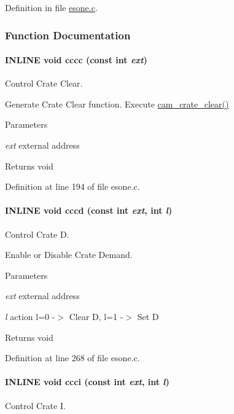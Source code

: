 Definition in file \hyperlink{esone_8c_source}{esone.c}.

\subsubsection{Function Documentation}
\paragraph[{cccc}]{\setlength{\rightskip}{0pt plus 5cm}INLINE void cccc (const int {\em ext})}\hfill\label{esone_8c_af3ecfc14e0b7fe8c1f06bbc47be53ec2}
Control Crate Clear.

Generate Crate Clear function. Execute \hyperlink{group__mcstdfunctionh_ga9fb70c7c5fb16d3807373902b137fe3e}{cam\_\-crate\_\-clear()}


\begin{DoxyParams}{Parameters}
\item[{\em ext}]external address \end{DoxyParams}
\begin{DoxyReturn}{Returns}
void 
\end{DoxyReturn}


Definition at line 194 of file esone.c.
\paragraph[{cccd}]{\setlength{\rightskip}{0pt plus 5cm}INLINE void cccd (const int {\em ext}, \/  int {\em l})}\hfill\label{esone_8c_afebd482508233fc5203cd61d96aefa52}
Control Crate D.

Enable or Disable Crate Demand.


\begin{DoxyParams}{Parameters}
\item[{\em ext}]external address \item[{\em l}]action l=0 -\/$>$ Clear D, l=1 -\/$>$ Set D \end{DoxyParams}
\begin{DoxyReturn}{Returns}
void 
\end{DoxyReturn}


Definition at line 268 of file esone.c.
\paragraph[{ccci}]{\setlength{\rightskip}{0pt plus 5cm}INLINE void ccci (const int {\em ext}, \/  int {\em l})}\hfill\label{esone_8c_ad5dda9ffd9dbec825608049d8f5fa736}
Control Crate I.

